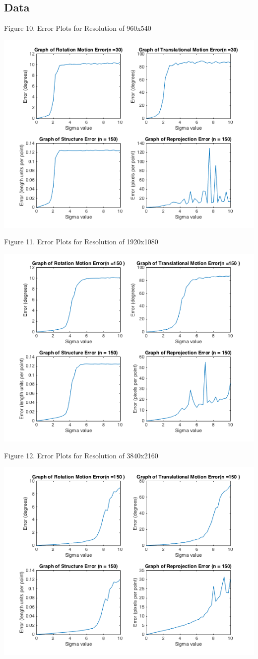 \documentclass{article}
\begin{document}
\subsection{Data}
\begin{center}
	\begin{center}Figure 10. Error Plots for Resolution of 960x540\end{center}
	\includegraphics[width=.7\textwidth,keepaspectratio]{960x540_error_plots.png}
	
	\begin{center}Figure 11. Error Plots for Resolution of 1920x1080\end{center}
	\includegraphics[width=.7\textwidth,keepaspectratio]{1920x1080_error_plots.png}
	
	\begin{center}Figure 12. Error Plots for Resolution of 3840x2160\end{center}
	\includegraphics[width=.7\textwidth,keepaspectratio]{3840x2160_error_plots.png}


\end{center}
\end{document}
